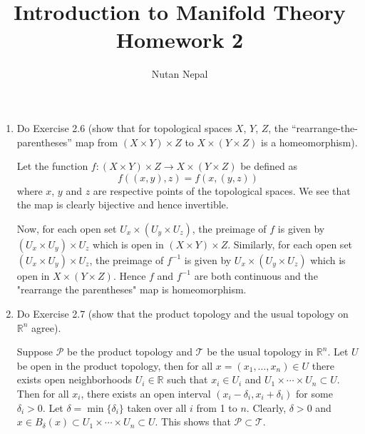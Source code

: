 \documentclass[12pt]{article}
\title{\textbf{Introduction to Manifold Theory} \\
\large Homework 2
}
\author{Nutan Nepal}
\begin{document}
\maketitle
\makebox[\linewidth]{\rule{200mm}{1pt}}
\vspace{1mm}

\begin{enumerate}

\item Do Exercise 2.6 (show that for topological spaces
    $X$, $Y$, $Z$, the “rearrange-the-parentheses” map
    from $(X\times Y)\times Z$ to $X\times(Y\times Z)$
    is a homeomorphism).

\begin{mybox}

Let the function $f:(X\times Y)\times Z \to 
X\times(Y\times Z)$ be defined as
$$f((x,y),z)=f(x,(y,z))$$
where $x$, $y$ and $z$ are respective points of
the topological spaces. We see that the map is
clearly bijective and hence invertible.

\vspace*{2mm}
Now, for each open set $U_x\times (U_y\times U_z)$,
the preimage of $f$
is given by $(U_x\times U_y)\times U_z$
which is open in $(X\times Y)\times Z$. Similarly,
for each open set $(U_x\times U_y)\times U_z$,
the preimage of $f^{-1}$
is given by $U_x\times (U_y\times U_z)$
which is open in $X\times (Y\times Z)$.
Hence $f$ and $f^{-1}$ are both continuous and the
"rearrange the parentheses" map is homeomorphism.
\end{mybox}


\item Do Exercise 2.7 (show that the product topology
    and the usual topology on $\mathbb{R}^n$ agree).
 
\begin{mybox}

    Suppose $\mathscr{P}$ be the product topology and
    $\mathscr{T}$ be the usual topology in $\mathbb{R}^n$.
    Let $U$ be open in the product topology, then
    for all $x=(x_1,\ldots,x_n) \in U$ there exists 
    open neighborhoods $U_i\in \mathbb{R}$ such that
    $x_i\in U_i$ and $U_1\times \cdots 
    \times U_n \subset U$. Then for all $x_i$, there
    exists an open interval $(x_i-\delta_i,x_i+\delta_i)$
    for some $\delta_i>0$.
    Let $\delta=\min\{\delta_i\}$ taken over
    all $i$ from 1 to $n$. Clearly, $\delta>0$  and 
    $x\in B_\delta(x)\subset U_1\times \cdots 
    \times U_n \subset U$. This shows that
    $\mathscr{P}\subset \mathscr{T}$.


\end{mybox}
\end{enumerate}
\end{document}
